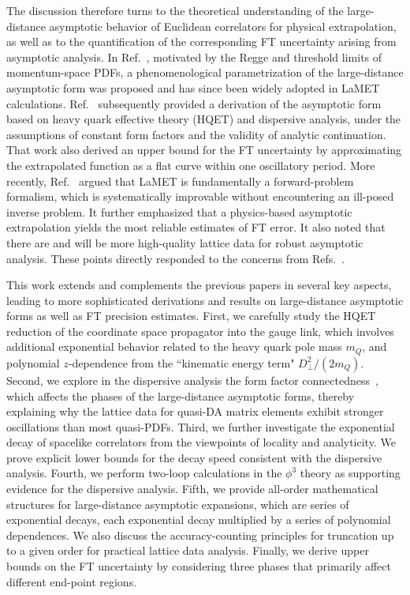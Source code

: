 \documentclass[a4paper,11pt]{article}
\begin{document}
The discussion therefore turns to the theoretical understanding of the large-distance asymptotic behavior of Euclidean correlators for physical extrapolation, as well as to the quantification of the corresponding FT uncertainty arising from asymptotic analysis. In Ref.~\cite{Ji:2020brr}, motivated by the Regge and threshold limits of momentum-space PDFs, a phenomenological parametrization of the large-distance asymptotic form was proposed and has since been widely adopted in LaMET calculations. Ref.~\cite{Gao:2021dbh} subsequently provided a derivation of the asymptotic form based on heavy quark effective theory (HQET) and dispersive analysis, under the assumptions of constant form factors and the validity of analytic continuation. That work also derived an upper bound for the FT uncertainty by approximating the extrapolated function as a flat curve within one oscillatory period. More recently, Ref.~\cite{Chen:2025cxr} argued that LaMET is fundamentally a forward-problem formalism, which is systematically improvable without encountering an ill-posed inverse problem. It further emphasized that a physics-based asymptotic extrapolation yields the most reliable estimates of FT error. It also noted that there are and will be more high-quality lattice data for robust asymptotic analysis. These points directly responded to the concerns from Refs.~\cite{Dutrieux:2025jed,Dutrieux:2025axb}. 

This work extends and complements the previous papers in several key aspects, leading to more sophisticated derivations and results on large-distance asymptotic forms as well as FT precision estimates. First, we carefully study the HQET reduction of the coordinate space propagator into the gauge link, which involves additional exponential behavior related to the heavy quark pole mass $m_Q$, and polynomial $z$-dependence from the ``kinematic energy term" $D_{\perp}^2/(2 m_Q)$. Second, we explore in the dispersive analysis the form factor connectedness~\cite{Jaffe:1983hp}, which affects the phases of the large-distance asymptotic forms, thereby explaining why the lattice data for quasi-DA matrix elements exhibit stronger oscillations than most quasi-PDFs. Third, we further investigate the exponential decay of spacelike correlators from the viewpoints of locality and analyticity. We prove explicit lower bounds for the decay speed consistent with the dispersive analysis. Fourth, we perform two-loop calculations in the $\phi^3$ theory as supporting evidence for the dispersive analysis. Fifth, we provide all-order mathematical structures for large-distance asymptotic expansions, which are series of exponential decays, each exponential decay multiplied by a series of polynomial dependences. We also discuss the accuracy-counting principles for truncation up to a given order for practical lattice data analysis. Finally, we derive upper bounds on the FT uncertainty by considering three phases that primarily affect different end-point regions. 
\end{document}
